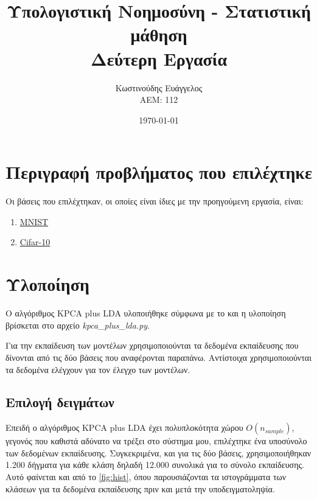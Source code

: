 \documentclass[a4paper]{article}
\title{Υπολογιστική Νοημοσύνη - Στατιστική μάθηση \\ Δεύτερη Εργασία}
\author{Κωστινούδης Ευάγγελος \\ΑΕΜ: 112}
\date{\today}
\begin{document}
\maketitle
{}
\newpage
{}

\section{Περιγραφή προβλήματος που επιλέχτηκε}

Οι βάσεις που επιλέχτηκαν, οι οποίες είναι ίδιες με την προηγούμενη εργασία,
είναι:

\begin{enumerate}
\item \href{http://yann.lecun.com/exdb/mnist/}{MNIST}
\item \href{https://www.cs.toronto.edu/~kriz/cifar.html}{Cifar-10}
\end{enumerate}


\section{Υλοποίηση}

Ο αλγόριθμος KPCA plus LDA υλοποιήθηκε σύμφωνα με το \cite{kpca_lda} και η
υλοποίηση βρίσκεται στο αρχείο \textit{kpca\_plus\_lda.py}.

Για την εκπαίδευση των μοντέλων χρησιμοποιούνται τα δεδομένα εκπαίδευσης που
δίνονται από τις δύο βάσεις που αναφέρονται παραπάνω. Αντίστοιχα
χρησιμοποιούνται τα δεδομένα ελέγχουν για τον έλεγχο των μοντέλων.

\subsection{Επιλογή δειγμάτων}

Επειδή ο αλγόριθμος KPCA plus LDA έχει πολυπλοκότητα χώρου $O(n_{sample})$,
γεγονός που καθιστά αδύνατο να τρέξει στο σύστημα μου, επιλέχτηκε ένα υποσύνολο
των δεδομένων εκπαίδευσης. Συγκεκριμένα, και για τις δύο βάσεις,
χρησιμοποιήθηκαν 1.200 δήγματα για κάθε κλάση δηλαδή 12.000 συνολικά για το
σύνολο εκπαίδευσης. Αυτό φαίνεται και από το \autoref{fig:hist}, όπου
παρουσιάζονται τα ιστογράμματα των κλάσεων για τα δεδομένα εκπαίδευσης πριν και
μετά την υποδειγματοληψία.
\end{document}
